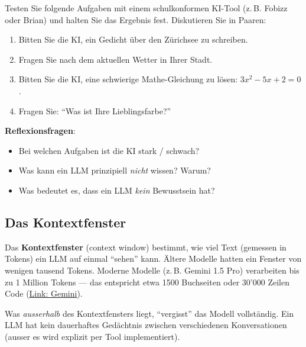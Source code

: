 \begin{myexercise}
Testen Sie folgende Aufgaben mit einem schulkonformen KI-Tool (z.\,B. Fobizz oder Brian)
und halten Sie das Ergebnis fest. Diskutieren Sie in Paaren:

\begin{enumerate}
    \item Bitten Sie die KI, ein Gedicht über den Zürichsee zu schreiben.
    \item Fragen Sie nach dem aktuellen Wetter in Ihrer Stadt.
    \item Bitten Sie die KI, eine schwierige Mathe-Gleichung zu lösen:
          $3x^2 - 5x + 2 = 0$.
    \item Fragen Sie: \enquote{Was ist Ihre Lieblingsfarbe?}
\end{enumerate}

\textbf{Reflexionsfragen}:
\begin{itemize}
    \item Bei welchen Aufgaben ist die KI stark / schwach?
    \item Was kann ein LLM prinzipiell \emph{nicht} wissen? Warum?
    \item Was bedeutet es, dass ein LLM \emph{kein} Bewusstsein hat?
\end{itemize}
\end{myexercise}

\subsection{Das Kontextfenster}

\begin{mydefinition}
Das \textbf{Kontextfenster} (context window) bestimmt, wie viel Text (gemessen in Tokens) ein LLM auf
einmal \enquote{sehen} kann. Ältere Modelle hatten ein Fenster von wenigen tausend
Tokens. Moderne Modelle (z.\,B. Gemini 1.5 Pro) verarbeiten bis zu 1 Million Tokens ---
das entspricht etwa 1500 Buchseiten oder 30'000 Zeilen Code (\href{https://gemini.google/overview/long-context/}{Link: Gemini}).
\end{mydefinition}

\begin{myremark}
Was \emph{ausserhalb} des Kontextfensters liegt, \enquote{vergisst} das Modell
vollständig. Ein LLM hat kein dauerhaftes Gedächtnis zwischen verschiedenen
Konversationen (ausser es wird explizit per Tool implementiert).
\end{myremark}

